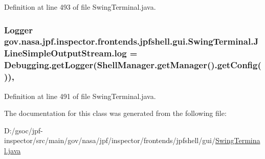Definition at line 493 of file Swing\+Terminal.\+java.

\subsubsection[{\texorpdfstring{log}{log}}]{\setlength{\rightskip}{0pt plus 5cm}Logger gov.\+nasa.\+jpf.\+inspector.\+frontends.\+jpfshell.\+gui.\+Swing\+Terminal.\+J\+Line\+Simple\+Output\+Stream.\+log = {\bf Debugging.\+get\+Logger}(Shell\+Manager.\+get\+Manager().get\+Config())\hspace{0.3cm}{\ttfamily [static]}, {\ttfamily [private]}}\hypertarget{classgov_1_1nasa_1_1jpf_1_1inspector_1_1frontends_1_1jpfshell_1_1gui_1_1_swing_terminal_1_1_j_line_simple_output_stream_ab1442dd9013dc82d6479a58314961445}{}\label{classgov_1_1nasa_1_1jpf_1_1inspector_1_1frontends_1_1jpfshell_1_1gui_1_1_swing_terminal_1_1_j_line_simple_output_stream_ab1442dd9013dc82d6479a58314961445}


Definition at line 491 of file Swing\+Terminal.\+java.



The documentation for this class was generated from the following file\+:\begin{DoxyCompactItemize}
\item 
D\+:/gsoc/jpf-\/inspector/src/main/gov/nasa/jpf/inspector/frontends/jpfshell/gui/\hyperlink{_swing_terminal_8java}{Swing\+Terminal.\+java}\end{DoxyCompactItemize}
